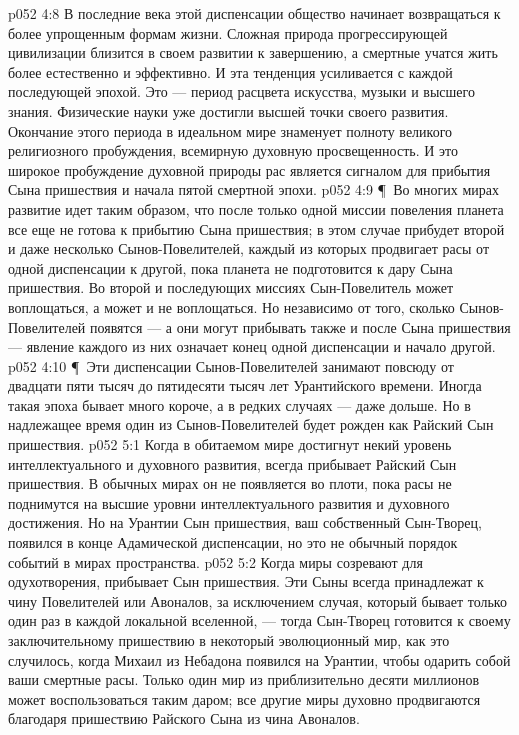 \vs p052 4:8 В последние века этой диспенсации общество начинает возвращаться к более упрощенным формам жизни. Сложная природа прогрессирующей цивилизации близится в своем развитии к завершению, а смертные учатся жить более естественно и эффективно. И эта тенденция усиливается с каждой последующей эпохой. Это --- период расцвета искусства, музыки и высшего знания. Физические науки уже достигли высшей точки своего развития. Окончание этого периода в идеальном мире знаменует полноту великого религиозного пробуждения, всемирную духовную просвещенность. И это широкое пробуждение духовной природы рас является сигналом для прибытия Сына пришествия и начала пятой смертной эпохи.
\vs p052 4:9 \P\ Во многих мирах развитие идет таким образом, что после только одной миссии повеления планета все еще не готова к прибытию Сына пришествия; в этом случае прибудет второй и даже несколько Сынов\hyp{}Повелителей, каждый из которых продвигает расы от одной диспенсации к другой, пока планета не подготовится к дару Сына пришествия. Во второй и последующих миссиях Сын\hyp{}Повелитель может воплощаться, а может и не воплощаться. Но независимо от того, сколько Сынов\hyp{}Повелителей появятся --- а они могут прибывать также и после Сына пришествия --- явление каждого из них означает конец одной диспенсации и начало другой.
\vs p052 4:10 \P\ Эти диспенсации Сынов\hyp{}Повелителей занимают повсюду от двадцати пяти тысяч до пятидесяти тысяч лет Урантийского времени. Иногда такая эпоха бывает много короче, а в редких случаях --- даже дольше. Но в надлежащее время один из Сынов\hyp{}Повелителей будет рожден как Райский Сын пришествия.
\vs p052 5:1 Когда в обитаемом мире достигнут некий уровень интеллектуального и духовного развития, всегда прибывает Райский Сын пришествия. В обычных мирах он не появляется во плоти, пока расы не поднимутся на высшие уровни интеллектуального развития и духовного достижения. Но на Урантии Сын пришествия, ваш собственный Сын\hyp{}Творец, появился в конце Адамической диспенсации, но это не обычный порядок событий в мирах пространства.
\vs p052 5:2 Когда миры созревают для одухотворения, прибывает Сын пришествия. Эти Сыны всегда принадлежат к чину Повелителей или Авоналов, за исключением случая, который бывает только один раз в каждой локальной вселенной, --- тогда Сын\hyp{}Творец готовится к своему заключительному пришествию в некоторый эволюционный мир, как это случилось, когда Михаил из Небадона появился на Урантии, чтобы одарить собой ваши смертные расы. Только один мир из приблизительно десяти миллионов может воспользоваться таким даром; все другие миры духовно продвигаются благодаря пришествию Райского Сына из чина Авоналов.
